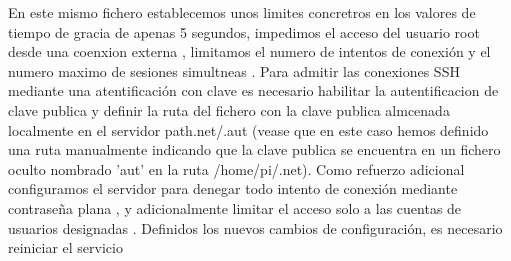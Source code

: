 En este mismo fichero establecemos unos limites concretros en los valores de tiempo de gracia  de apenas 5 segundos, impedimos el acceso del usuario root desde una coenxion externa , limitamos el numero de intentos de conexión  y el numero maximo de sesiones simultneas . Para admitir las conexiones SSH mediante una atentificación con clave es necesario habilitar la autentificacion de clave publica  y definir la ruta del fichero con la clave publica almcenada localmente en el servidor  path{.net/.aut} (vease que en este caso hemos definido una ruta manualmente indicando que la clave publica se encuentra en un fichero oculto nombrado 'aut' en la ruta /home/pi/.net). Como refuerzo adicional configuramos el servidor para denegar todo intento de conexión mediante contraseña plana  , y adicionalmente limitar el acceso solo a las cuentas de usuarios designadas . Definidos los nuevos cambios de configuración, es necesario reiniciar el servicio
